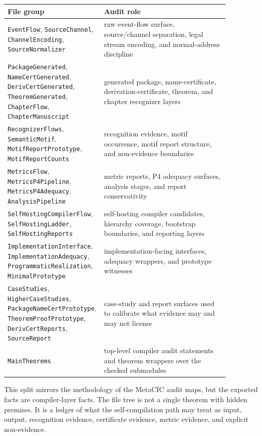 \begin{center}
\begin{tabular}{p{0.31\linewidth}p{0.56\linewidth}}
\textbf{File group} & \textbf{Audit role} \\
\hline
\texttt{EventFlow}, \texttt{SourceChannel}, \texttt{ChannelEncoding},
\texttt{SourceNormalizer} &
raw event-flow surface, source/channel separation, legal stream encoding, and
normal-address discipline \\
\texttt{PackageGenerated}, \texttt{NameCertGenerated},
\texttt{DerivCertGenerated}, \texttt{TheoremGenerated},
\texttt{ChapterFlow}, \texttt{ChapterManuscript} &
generated package, name-certificate, derivation-certificate, theorem, and
chapter recognizer layers \\
\texttt{RecognizerFlows}, \texttt{SemanticMotif},
\texttt{MotifReportPrototype}, \texttt{MotifReportCounts} &
recognition evidence, motif occurrence, motif report structure, and
non-evidence boundaries \\
\texttt{MetricsFlow}, \texttt{MetricsP4Pipeline},
\texttt{MetricsP4Adequacy}, \texttt{AnalysisPipeline} &
metric reports, P4 adequacy surfaces, analysis stages, and report
conservativity \\
\texttt{SelfHostingCompilerFlow}, \texttt{SelfHostingLadder},
\texttt{SelfHostingReports} &
self-hosting compiler candidates, hierarchy coverage, bootstrap boundaries,
and reporting layers \\
\texttt{ImplementationInterface}, \texttt{ImplementationAdequacy},
\texttt{ProgrammaticRealization}, \texttt{MinimalPrototype} &
implementation-facing interfaces, adequacy wrappers, and prototype witnesses \\
\texttt{CaseStudies}, \texttt{HigherCaseStudies},
\texttt{PackageNameCertPrototype}, \texttt{TheoremProofPrototype},
\texttt{DerivCertReports}, \texttt{SourceReport} &
case-study and report surfaces used to calibrate what evidence may and may not
license \\
\texttt{MainTheorems} &
top-level compiler audit statements and theorem wrappers over the checked
submodules \\
\end{tabular}
\end{center}

This split mirrors the methodology of the MetaCIC audit maps, but the exported
facts are compiler-layer facts. The file tree is not a single theorem with
hidden premises. It is a ledger of what the self-compilation path may treat as
input, output, recognition evidence, certificate evidence, metric evidence,
and explicit non-evidence.

